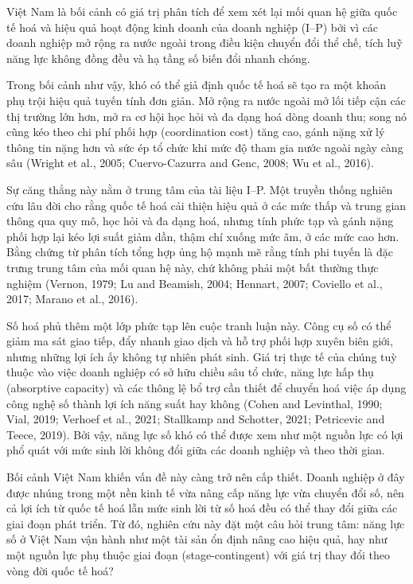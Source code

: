 \documentclass[12pt,a4paper]{article}
\begin{document}
Việt Nam là bối cảnh có giá trị phân tích để xem xét lại mối quan hệ
giữa quốc tế hoá và hiệu quả hoạt động kinh doanh của doanh nghiệp
(I--P) bởi vì các doanh nghiệp mở rộng ra nước ngoài trong điều kiện
chuyển đổi thể chế, tích luỹ năng lực không đồng đều và hạ tầng số biến
đổi nhanh chóng.

Trong bối cảnh như vậy, khó có thể giả định quốc tế hoá sẽ tạo ra một
khoản phụ trội hiệu quả tuyến tính đơn giản. Mở rộng ra nước ngoài mở
lối tiếp cận các thị trường lớn hơn, mở ra cơ hội học hỏi và đa dạng hoá
dòng doanh thu; song nó cũng kéo theo chi phí phối hợp (coordination
cost) tăng cao, gánh nặng xử lý thông tin nặng hơn và sức ép tổ chức khi
mức độ tham gia nước ngoài ngày càng sâu (Wright et al., 2005;
Cuervo-Cazurra and Genc, 2008; Wu et al., 2016).

Sự căng thẳng này nằm ở trung tâm của tài liệu I--P. Một truyền thống
nghiên cứu lâu đời cho rằng quốc tế hoá cải thiện hiệu quả ở các mức
thấp và trung gian thông qua quy mô, học hỏi và đa dạng hoá, nhưng tính
phức tạp và gánh nặng phối hợp lại kéo lợi suất giảm dần, thậm chí xuống
mức âm, ở các mức cao hơn. Bằng chứng từ phân tích tổng hợp ủng hộ mạnh
mẽ rằng tính phi tuyến là đặc trưng trung tâm của mối quan hệ này, chứ
không phải một bất thường thực nghiệm (Vernon, 1979; Lu and Beamish,
2004; Hennart, 2007; Coviello et al., 2017; Marano et al., 2016).

Số hoá phủ thêm một lớp phức tạp lên cuộc tranh luận này. Công cụ số có
thể giảm ma sát giao tiếp, đẩy nhanh giao dịch và hỗ trợ phối hợp xuyên
biên giới, nhưng những lợi ích ấy không tự nhiên phát sinh. Giá trị thực
tế của chúng tuỳ thuộc vào việc doanh nghiệp có sở hữu chiều sâu tổ
chức, năng lực hấp thụ (absorptive capacity) và các thông lệ bổ trợ cần
thiết để chuyển hoá việc áp dụng công nghệ số thành lợi ích năng suất
hay không (Cohen and Levinthal, 1990; Vial, 2019; Verhoef et al., 2021;
Stallkamp and Schotter, 2021; Petricevic and Teece, 2019). Bởi vậy, năng
lực số khó có thể được xem như một nguồn lực có lợi phổ quát với mức
sinh lời không đổi giữa các doanh nghiệp và theo thời gian.

Bối cảnh Việt Nam khiến vấn đề này càng trở nên cấp thiết. Doanh nghiệp
ở đây được nhúng trong một nền kinh tế vừa nâng cấp năng lực vừa chuyển
đổi số, nên cả lợi ích từ quốc tế hoá lẫn mức sinh lời từ số hoá đều có
thể thay đổi giữa các giai đoạn phát triển. Từ đó, nghiên cứu này đặt
một câu hỏi trung tâm: năng lực số ở Việt Nam vận hành như một tài sản
ổn định nâng cao hiệu quả, hay như một nguồn lực phụ thuộc giai đoạn
(stage-contingent) với giá trị thay đổi theo vòng đời quốc tế hoá?
\end{document}
